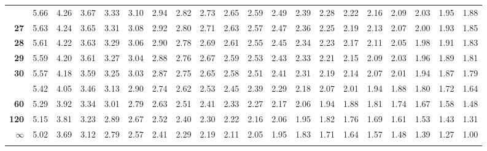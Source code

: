 \documentclass[]{article}
\begin{document}
\begin{landscape}
\begin{longtable}{>{\bfseries}r|rrrrrrrrrrrrrrrrrrr}
\addlinespace
26 & 5.66 & 4.26 & 3.67 & 3.33 & 3.10 & 2.94 & 2.82 & 2.73 & 2.65 & 2.59 & 2.49 & 2.39 & 2.28 & 2.22 & 2.16 & 2.09 & 2.03 & 1.95 & 1.88\\
27 & 5.63 & 4.24 & 3.65 & 3.31 & 3.08 & 2.92 & 2.80 & 2.71 & 2.63 & 2.57 & 2.47 & 2.36 & 2.25 & 2.19 & 2.13 & 2.07 & 2.00 & 1.93 & 1.85\\
28 & 5.61 & 4.22 & 3.63 & 3.29 & 3.06 & 2.90 & 2.78 & 2.69 & 2.61 & 2.55 & 2.45 & 2.34 & 2.23 & 2.17 & 2.11 & 2.05 & 1.98 & 1.91 & 1.83\\
29 & 5.59 & 4.20 & 3.61 & 3.27 & 3.04 & 2.88 & 2.76 & 2.67 & 2.59 & 2.53 & 2.43 & 2.33 & 2.21 & 2.15 & 2.09 & 2.03 & 1.96 & 1.89 & 1.81\\
30 & 5.57 & 4.18 & 3.59 & 3.25 & 3.03 & 2.87 & 2.75 & 2.65 & 2.58 & 2.51 & 2.41 & 2.31 & 2.19 & 2.14 & 2.07 & 2.01 & 1.94 & 1.87 & 1.79\\
\addlinespace
40 & 5.42 & 4.05 & 3.46 & 3.13 & 2.90 & 2.74 & 2.62 & 2.53 & 2.45 & 2.39 & 2.29 & 2.18 & 2.07 & 2.01 & 1.94 & 1.88 & 1.80 & 1.72 & 1.64\\
60 & 5.29 & 3.92 & 3.34 & 3.01 & 2.79 & 2.63 & 2.51 & 2.41 & 2.33 & 2.27 & 2.17 & 2.06 & 1.94 & 1.88 & 1.81 & 1.74 & 1.67 & 1.58 & 1.48\\
120 & 5.15 & 3.81 & 3.23 & 2.89 & 2.67 & 2.52 & 2.40 & 2.30 & 2.22 & 2.16 & 2.06 & 1.95 & 1.82 & 1.76 & 1.69 & 1.61 & 1.53 & 1.43 & 1.31\\
$\infty$ & 5.02 & 3.69 & 3.12 & 2.79 & 2.57 & 2.41 & 2.29 & 2.19 & 2.11 & 2.05 & 1.95 & 1.83 & 1.71 & 1.64 & 1.57 & 1.48 & 1.39 & 1.27 & 1.00\\*
\end{longtable}
\endgroup{}
\end{landscape}
\end{document}

